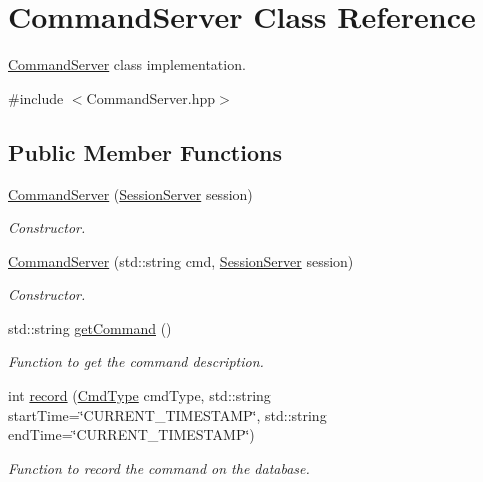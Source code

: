 \hypertarget{classCommandServer}{
\section{CommandServer Class Reference}
\label{classCommandServer}
}


\hyperlink{classCommandServer}{CommandServer} class implementation.  




{\ttfamily \#include $<$CommandServer.hpp$>$}

\subsection*{Public Member Functions}
\begin{DoxyCompactItemize}
\item 
\hyperlink{classCommandServer_aa15f07a3768c8b15ace8b470d3ff9b34}{CommandServer} (\hyperlink{classSessionServer}{SessionServer} session)
\begin{DoxyCompactList}\small\item\em Constructor. \item\end{DoxyCompactList}\item 
\hyperlink{classCommandServer_a1ed27508bf43e78ab53b9c8d1d6abcd7}{CommandServer} (std::string cmd, \hyperlink{classSessionServer}{SessionServer} session)
\begin{DoxyCompactList}\small\item\em Constructor. \item\end{DoxyCompactList}\item 
std::string \hyperlink{classCommandServer_a577cacdfa0a6542d39b8f399ff575ecf}{getCommand} ()
\begin{DoxyCompactList}\small\item\em Function to get the command description. \item\end{DoxyCompactList}\item 
int \hyperlink{classCommandServer_a365b35bdba349be4d2b33a9b4e3001ba}{record} (\hyperlink{CommandServer_8hpp_a7ae3a49efad67c34030ecbed1d947844}{CmdType} cmdType, std::string startTime=\char`\"{}CURRENT\_\-TIMESTAMP\char`\"{}, std::string endTime=\char`\"{}CURRENT\_\-TIMESTAMP\char`\"{})
\begin{DoxyCompactList}\small\item\em Function to record the command on the database. \item\end{DoxyCompactList}\item 

\end{DoxyCompactItemize}
